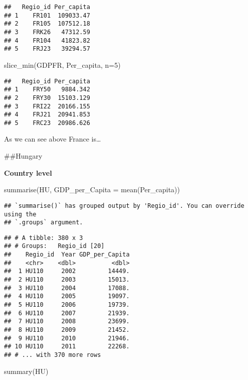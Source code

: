 \documentclass[
]{article}
\newenvironment{Shaded}{\begin{snugshade}}{\end{snugshade}}
\newcommand{\AttributeTok}[1]{\textcolor[rgb]{0.77,0.63,0.00}{#1}}
\newcommand{\DecValTok}[1]{\textcolor[rgb]{0.00,0.00,0.81}{#1}}
\newcommand{\FunctionTok}[1]{\textcolor[rgb]{0.00,0.00,0.00}{#1}}
\newcommand{\NormalTok}[1]{#1}
\begin{document}
\begin{verbatim}
##   Regio_id Per_capita
## 1    FR101  109033.47
## 2    FR105  107512.18
## 3    FRK26   47312.59
## 4    FR104   41823.82
## 5    FRJ23   39294.57
\end{verbatim}

\begin{Shaded}
\begin{Highlighting}[]
\FunctionTok{slice\_min}\NormalTok{(GDPFR, Per\_capita, }\AttributeTok{n=}\DecValTok{5}\NormalTok{)}
\end{Highlighting}
\end{Shaded}

\begin{verbatim}
##   Regio_id Per_capita
## 1    FRY50   9884.342
## 2    FRY30  15103.129
## 3    FRI22  20166.155
## 4    FRJ21  20941.853
## 5    FRC23  20986.626
\end{verbatim}

As we can see above France is\ldots{}

\#\#Hungary

\textbf{Country level}

\begin{Shaded}
\begin{Highlighting}[]
    \FunctionTok{summarise}\NormalTok{(HU, }\AttributeTok{GDP\_per\_Capita =} \FunctionTok{mean}\NormalTok{(Per\_capita))}
\end{Highlighting}
\end{Shaded}

\begin{verbatim}
## `summarise()` has grouped output by 'Regio_id'. You can override using the
## `.groups` argument.
\end{verbatim}

\begin{verbatim}
## # A tibble: 380 x 3
## # Groups:   Regio_id [20]
##    Regio_id  Year GDP_per_Capita
##    <chr>    <dbl>          <dbl>
##  1 HU110     2002         14449.
##  2 HU110     2003         15013.
##  3 HU110     2004         17088.
##  4 HU110     2005         19097.
##  5 HU110     2006         19739.
##  6 HU110     2007         21939.
##  7 HU110     2008         23699.
##  8 HU110     2009         21452.
##  9 HU110     2010         21946.
## 10 HU110     2011         22268.
## # ... with 370 more rows
\end{verbatim}

\begin{Shaded}
\begin{Highlighting}[]
\FunctionTok{summary}\NormalTok{(HU)}
\end{Highlighting}
\end{Shaded}
\end{document}
